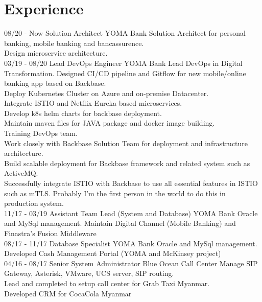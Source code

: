 \documentclass[]{friggeri-cv}
\begin{document}
\section{Experience}
\begin{entrylist}
  \entry
	{08/20 - Now}
	{Solution Architect}
	{YOMA Bank}
	{Solution Architect for personal banking, mobile banking and bancassurence.\\Design microservice architecture.\\}
  \entry
    {03/19 - 08/20}
    {Lead DevOps Engineer}
    {YOMA Bank}
    {Lead DevOps in Digital Transformation. Designed CI/CD pipeline and Gitflow for new mobile/online banking app based on Backbase.\\Deploy Kubernetes Cluster on Azure and on-premise Datacenter.\\Integrate ISTIO and Netflix Eureka based microservices.\\Develop k8s helm charts for backbase deployment.\\Maintain maven files for JAVA package and docker image building.\\Training DevOps team.\\Work closely with Backbase Solution Team for deployment and infrastructure architecture.\\Build scalable deployment for Backbase framework and related system such as ActiveMQ.\\Successfully integrate ISTIO with Backbase to use all essential features in ISTIO such as mTLS. Probably I'm the first person in the world to do this in production system.\\}
  \entry
    {11/17 - 03/19}
    {Assistant Team Lead (System and Database)}
    {YOMA Bank}
    {Oracle and MySql management. Maintain Digital Channel (Mobile Banking) and Finastra's Fusion Middleware\\
    }
  \entry
    {08/17 - 11/17}
    {Database Specialist}
    {YOMA Bank}
    {Oracle and MySql management. Developed Cash Management Portal (YOMA and McKinsey project)\\}
  \entry
    {04/16 - 08/17}
    {Senior System Administrator}
    {Blue Ocean Call Center}
    {Manage SIP Gateway, Asterisk, VMware, UCS server, SIP routing.\\ Lead and completed to setup call center for Grab Taxi Myanmar.\\ Developed CRM for CocaCola Myanmar\\ }
    ~
\end{entrylist}
\newpage
~
\end{document}
